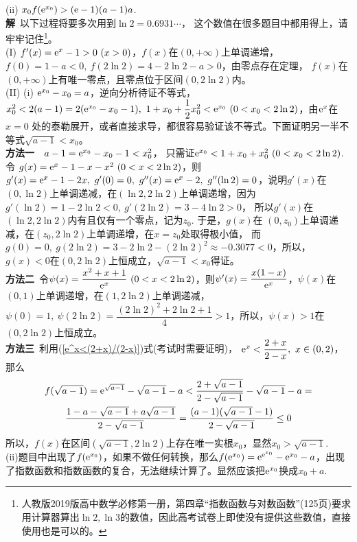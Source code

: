 \begin{enumerate}[label={【\textbf{例\thechapter.\arabic*}】},
 leftmargin=\inteval{\myenumleftmargin}pt,
 itemsep=\inteval{\myenumitempsep}pt,
 itemindent=\inteval{\myenumitemindent}pt]
(ii) $ x_0f(\mathrm{e}^{x_0})> (\mathrm{e}-1)(a-1)a $. \\
\textbf{解}\ 以下过程将要多次用到$ \ln 2=0.6931\cdots $，
这个数值在很多题目中都用得上，请牢牢记住\footnote{人教版2019版高中数学必修第一册，第四章“指数函数与对数函数”(125页)要求用计算器算出$ \ln 2,\ln 3 $的数值，因此高考试卷上即使没有提供这些数值，直接使用也是可以的。}。\\
(I) $ f'(x)=\e^x-1>0\ (x>0) $，$ f(x) $在$ (0,+\infty) $上单调递增，
$ f(0)=1-a<0,\ f(2\ln 2)=4-2\ln 2-a>0 $，由零点存在定理，
$ f(x) $在$ (0,+\infty) $上有唯一零点，且零点位于区间$ (0,2\ln2) $内。\\
(II) (i) $ \mathrm{e}^{x_0}-x_0=a $，逆向分析待证不等式，$ x_0^2<2(a-1)=2(\mathrm{e}^{x_0}
-x_0-1),\ 1+x_0+\dfrac{1}{2}x_0^2< \mathrm{e}^{x_0}\ (0<x_0<2\ln 2) $，由$ \mathrm{e}^x $在$ x=0 $
处的泰勒展开，或者直接求导，都很容易验证该不等式。下面证明另一半不等式$ \sqrt{a-1}< x_0 $。\\
\textbf{方法一}\ \ $ a-1=\mathrm{e}^{x_0}-x_0-1< x_0^2 $，
只需证$ \mathrm{e}^{x_0}< 1+x_0+x_0^2\ (0<x_0<2\ln 2) $. 令
$ g(x)=\e^x-1-x-x^2\ (0<x<2\ln 2) $，则$ g'(x)=\mathrm{e}^x-1-2x,\ g'(0)=0,\ g''(x)=
\mathrm{e}^x-2,\ g''(\ln 2)=0 $，说明$ g'(x) $在$ (0,\ln 2) $上单调递减，在$ (\ln2,
2\ln2) $上单调递增，因为$ g'(\ln2)=1-2\ln 2<0,\ g'(2\ln 2)=3-4\ln 2>0 $，
所以$ g'(x) $在$ (\ln2,2\ln2 ) $内有且仅有一个零点，记为$ z_0 $. 于是，$ g(x) $在
$ (0,z_0) $上单调递减，在$ (z_0,2\ln 2) $上单调递增，在$ x=z_0 $处取得极小值，
而$ g(0)=0,\ g(2\ln 2)=3-2\ln2-(2\ln2)^2\approx -0.3077<0 $，所以，
$ g(x)<0 $在$ (0,2\ln2) $上恒成立，$ \sqrt{a-1} < x_0 $得证。\\
\textbf{方法二}\ 令$ \psi(x)=\dfrac{x^2+x+1}{\mathrm{e}^x}\ (0<x<2\ln 2) $，则$ \psi'(x)=\dfrac{x(1-x)}{\mathrm{e}^x} $，$ \psi(x) $在$ (0,1) $上单调递增，在$ (1,2\ln2) $上单调递减，$ \psi(0)=1,\ \psi(2\ln 2)=\dfrac{(2\ln 2)^2+2\ln 2+1}{4}>1 $，所以，$ \psi(x)>1 $在$ (0,2\ln2) $上恒成立。\\
\textbf{方法三}\ 利用(\ref{e^x<(2+x)/(2-x)})式(考试时需要证明)，
$ \mathrm{e}^{x}<\dfrac{2+x}{2-x},\ x\in (0,2) $，那么
\begin{gather*}
    f(\sqrt{a-1})=\mathrm{e}^{\sqrt{a-1}}-\sqrt{a-1}-a<\dfrac{2+\sqrt{a-1}}{2-\sqrt{a-1}}
    -\sqrt{a-1}-a=\\ \dfrac{1-a-\sqrt{a-1}+a\sqrt{a-1}}{2-\sqrt{a-1}}=
    \dfrac{(a-1)(\sqrt{a-1}-1)}{2-\sqrt{a-1}}\leq 0
\end{gather*}
所以，$ f(x) $在区间$ (\sqrt{a-1},2\ln2) $上存在唯一实根$ x_0 $，显然$ x_0>\sqrt{a-1} $.\\
(ii)题目中出现了$ f(\mathrm{e}^{x_0}) $，如果不做任何转换，那么$ f(\mathrm{e}^{x_0})=\mathrm{e}^{\mathrm{e}^{x_0}}-
\mathrm{e}^{x_0}-a $，出现了指数函数和指数函数的复合，无法继续计算了。显然应该把$ \mathrm{e}^{x_0} $换成$ x_0+a $. 

\end{enumerate}
